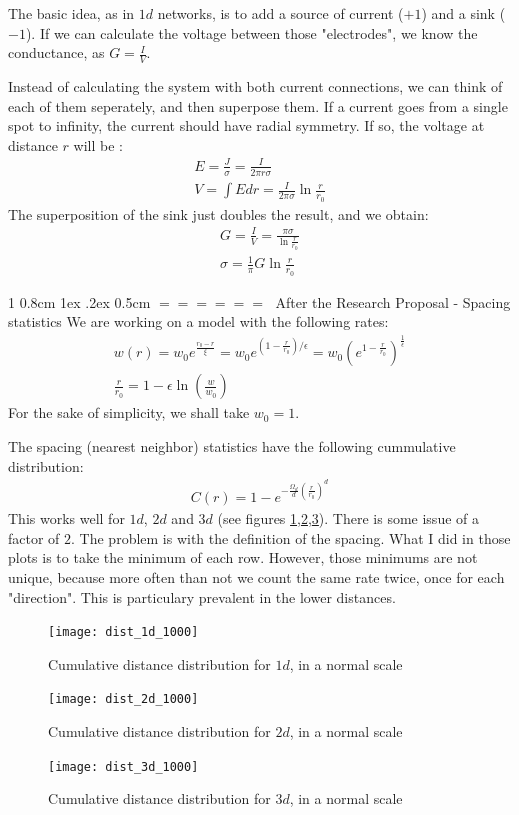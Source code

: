 \documentclass[onecolumn,fleqn,notitlepage,secnumarabic]{revtex4}
\makeatletter
\def\section{%
  \@startsection
    {section}%
    {1}%
    {\z@}%
    {0.8cm \@plus1ex \@minus .2ex}%
    {0.5cm}%
    {\Large\bf $=\!=\!=\!=\!=\!=\;$}%
}%
\makeatother
\begin{document}
The basic idea, as in $1d$ networks, is to add a source of current ($+1$) and a sink ($-1$). If we can calculate the voltage between those "electrodes", we know the conductance, as $G = \frac{I}{V}$. 

Instead of calculating the system with both current connections, we can think of each of them seperately, and then superpose them. If a current goes from a single spot to infinity, the current should have radial symmetry. If so, the voltage at distance $r$ will be :
\begin{align}
  E = \frac{J}{\sigma} = \frac{I}{2\pi r\sigma} \\
  V = \int E dr = \frac{I}{2\pi\sigma}\ln\frac{r}{r_0}
\end{align}
The superposition of the sink just doubles the result, and we obtain:
\begin{align}
    G = \frac{I}{V} = \frac{\pi\sigma }{\ln\frac{r}{r_0}}  \\
    \sigma = \frac{1}{\pi}G\ln\frac{r}{r_0}
\end{align}


\section{After the Research Proposal - Spacing statistics}
We are working on a model with the following rates:
\begin{align}
    w(r) = w_0 e^{\frac{r_0-r}{\xi}}=w_0e^{(1-\frac{r}{r_0})/\epsilon} = w_0 \left(e^{1-\frac{r}{r_0}}\right)^\frac{1}{\epsilon}\\
    \frac{r}{r_0} = 1 - \epsilon\ln \left(\frac{w}{w_0}\right)
\end{align}
For the sake of simplicity, we shall take $w_0=1$.

The spacing (nearest neighbor) statistics have the following cummulative distribution:
\begin{align}
    C(r) = 1-e^{-\frac{\Omega_d}{d}\left(\frac{r}{r_0}\right)^d}
\end{align}
This works well for $1d$, $2d$ and $3d$ (see figures \ref{fig:1d_dist},\ref{fig:2d_dist},\ref{fig:3d_dist}). There is some issue of a factor of $2$. The problem is with the definition of the spacing. What I did in those plots is to take the minimum of each row. However, those minimums are not unique, because more often than not we count the same rate twice, once for each "direction". This is particulary prevalent in the lower distances.

\begin{figure}[H]
    \texttt{[image: dist\_1d\_1000]}
    \caption{Cumulative distance distribution for $1d$, in a normal scale}
    \label{fig:1d_dist}
\end{figure}
\begin{figure}[H]
    \texttt{[image: dist\_2d\_1000]}
    \caption{Cumulative distance distribution for $2d$, in a normal scale}
    \label{fig:2d_dist}
\end{figure}
\begin{figure}[H]
    \texttt{[image: dist\_3d\_1000]}
    \caption{Cumulative distance distribution for $3d$, in a normal scale}
    \label{fig:3d_dist}
\end{figure}
\end{document}
